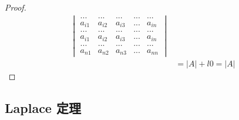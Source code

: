 \documentclass[blue,normal,cn]{elegantnote}
\begin{document}
\begin{proof}
\begin{equation*}
\begin{aligned}
\begin{vmatrix}
                ...&...&...&...&...\\
                a_{i1}&a_{i2} & a_{i3} &...& a_{in}\\
                ...&...&...&...&...\\
                a_{i1}&a_{i2} & a_{i3} &...& a_{in}\\
                ...&...&...&...&...\\
                a_{n1}&a_{n2} & a_{n3} &...& a_{nn}
                \end{vmatrix}
                \\
        &=|A|+l0=|A|
        \end{aligned}
        \end{equation*}
\end{proof}

\subsection{Laplace 定理}
\end{document}
